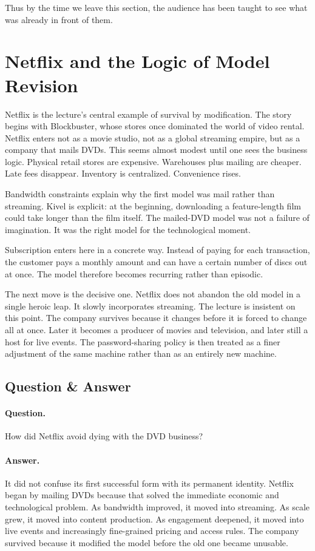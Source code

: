 Thus by the time we leave this section, the audience has been taught to see what was already in front of them.

\section{Netflix and the Logic of Model Revision}

Netflix is the lecture's central example of survival by modification. The story begins with Blockbuster, whose stores once dominated the world of video rental. Netflix enters not as a movie studio, not as a global streaming empire, but as a company that mails DVDs. This seems almost modest until one sees the business logic. Physical retail stores are expensive. Warehouses plus mailing are cheaper. Late fees disappear. Inventory is centralized. Convenience rises.

Bandwidth constraints explain why the first model was mail rather than streaming. Kivel is explicit: at the beginning, downloading a feature-length film could take longer than the film itself. The mailed-DVD model was not a failure of imagination. It was the right model for the technological moment.

Subscription enters here in a concrete way. Instead of paying for each transaction, the customer pays a monthly amount and can have a certain number of discs out at once. The model therefore becomes recurring rather than episodic.

The next move is the decisive one. Netflix does not abandon the old model in a single heroic leap. It slowly incorporates streaming. The lecture is insistent on this point. The company survives because it changes before it is forced to change all at once. Later it becomes a producer of movies and television, and later still a host for live events. The password-sharing policy is then treated as a finer adjustment of the same machine rather than as an entirely new machine.

\subsection{Question \& Answer}

\paragraph{Question.} How did Netflix avoid dying with the DVD business?

\paragraph{Answer.} It did not confuse its first successful form with its permanent identity. Netflix began by mailing DVDs because that solved the immediate economic and technological problem. As bandwidth improved, it moved into streaming. As scale grew, it moved into content production. As engagement deepened, it moved into live events and increasingly fine-grained pricing and access rules. The company survived because it modified the model before the old one became unusable.

